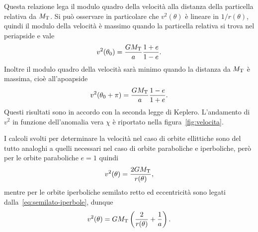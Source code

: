 {
Questa relazione lega il modulo quadro della velocità alla distanza della
particella relativa da $M_\textup{T}$. Si può osservare in particolare che
$v^2(\theta)$ è lineare in $1/r(\theta)$, quindi il modulo della velocità è
massimo quando la particella relativa si trova nel periapside e vale
\begin{equation}
  v^2(\theta_0) = \frac{GM_\textup{T}}{a}\frac{1+e}{1-e}.
\end{equation}
Inoltre il modulo quadro della velocità sarà minimo quando la distanza da
$M_\textup{T}$ è massima, cioè all'apoapside
\begin{equation}
  v^2(\theta_0+\pi) = \frac{GM_\textup{T}}{a}\frac{1-e}{1+e}.
\end{equation}
Questi risultati sono in accordo con la seconda legge di Keplero. L'andamento di
$v^2$ in funzione dell'anomalia vera $\chi$ è riportato nella
figura~\ref{fig:velocita}.

I calcoli svolti per determinare la velocità nel caso di orbite ellittiche sono
del tutto analoghi a quelli necessari nel caso di orbite paraboliche e
iperboliche, però per le orbite paraboliche $e=1$ quindi
\begin{equation}
  \label{eq:velocita-parabola}
  v^2(\theta) = \frac{2GM_\textup{T}}{r(\theta)},
\end{equation}
mentre per le orbite iperboliche semilato retto ed eccentricità sono legati
dalla~\eqref{eq:semilato-iperbole}, dunque
\begin{equation}
  \label{eq:velocita-iperbole}
  v^2(\theta) = GM_\textup{T}
    \left(
      \frac{2}{r(\theta)} + \frac{1}{a}
    \right).
\end{equation}

}
